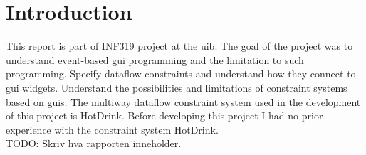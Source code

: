 \chapter{Introduction}

This report is part of INF319 project at the \gls{uib}. The goal of the project was to
understand event-based \gls{gui} programming and the limitation to such programming.
Specify dataflow constraints and understand how they connect to \gls{gui} widgets.
Understand the possibilities and limitations of constraint systems based on \gls{gui}s.
The multiway dataflow constraint system used in the development of this project is
HotDrink. Before developing this project I had no prior experience with the constraint 
system HotDrink. 
\\TODO: Skriv hva rapporten inneholder.
